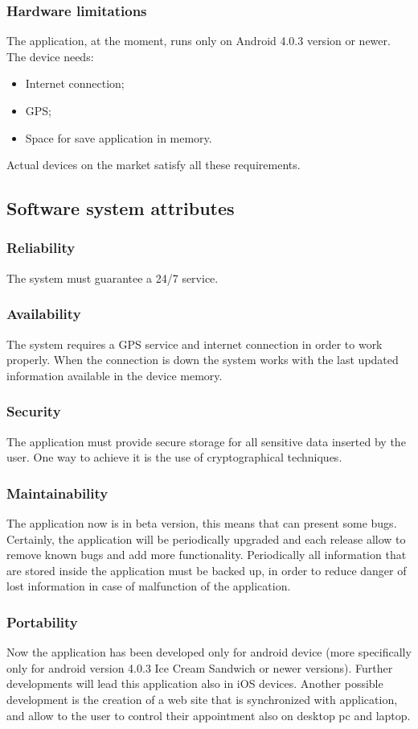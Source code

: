 \subsubsection{Hardware limitations}
	The application, at the moment, runs only on Android 4.0.3 version or newer. \\
	The device needs:
	\begin{itemize}
		\item Internet connection;
		\item GPS;
		\item Space for save application in memory.
	\end{itemize}
	Actual devices on the market satisfy all these requirements.
\subsection{Software system attributes}
\subsubsection{Reliability}
The system must guarantee a 24/7 service.
\subsubsection{Availability}
The system requires a GPS service and internet connection in order to work properly. When the connection is down the system works with the last updated information available in the device memory. 
\subsubsection{Security}
The application must provide secure storage for all sensitive data inserted by the user. One way to achieve it is the use of cryptographical techniques.
\subsubsection{Maintainability}
The application now is in beta version, this means that can present some bugs. Certainly, the application will be periodically upgraded and each release allow to remove known bugs and add more functionality.
Periodically all information that are stored inside the application must be backed up, in order to reduce danger of lost information in case of malfunction of the application.
\subsubsection{Portability}
Now the application has been developed only for android device (more specifically only for android version 4.0.3 Ice Cream Sandwich or newer versions).
Further developments will lead this application also in iOS devices.
Another possible development is the creation of a web site that is synchronized with application, and allow to the user to control their appointment also on desktop pc and laptop.
